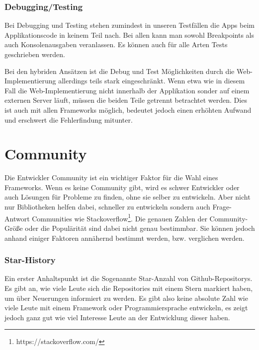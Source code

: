 \subsubsection{Debugging/Testing}
Bei Debugging und Testing stehen zumindest in unseren Testfällen die Apps beim Applikationscode in keinem Teil nach. Bei allen kann man sowohl Breakpoints als auch Konsolenausgaben veranlassen. Es können auch für alle Arten Tests geschrieben werden.

Bei den hybriden Ansätzen ist die Debug und Test Möglichkeiten  durch die Web-Implementierung allerdings teils stark eingeschränkt. Wenn etwa wie in diesem Fall die Web-Implementierung nicht innerhalb der Applikation sonder auf einem externen Server läuft, müssen die beiden Teile getrennt betrachtet werden. Dies ist auch mit allen Frameworks möglich, bedeutet jedoch einen erhöhten Aufwand und erschwert die Fehlerfindung mitunter.

\section{Community}
Die Entwickler Community ist ein wichtiger Faktor für die Wahl eines Frameworks. Wenn es keine Community gibt, wird es schwer Entwickler oder auch Lösungen für Probleme zu finden, ohne sie selber zu entwickeln. Aber nicht nur Bibliotheken helfen dabei, schneller zu entwickeln sondern auch Frage-Antwort Communities wie Stackoverflow\footnote{https://stackoverflow.com/}.  Die genauen Zahlen der Community-Größe oder die Populärität sind dabei nicht genau bestimmbar. Sie können jedoch anhand einiger Faktoren annähernd bestimmt werden, bzw. verglichen werden.

\subsubsection{Star-History}

Ein erster Anhaltspunkt ist die Sogenannte Star-Anzahl von Github-Repositorys. Es gibt an, wie viele Leute sich die Repositories mit einem Stern markiert haben, um über Neuerungen informiert zu werden. Es gibt also keine absolute Zahl wie viele Leute mit einem Framework oder Programmiersprache entwickeln, es zeigt jedoch ganz gut wie viel Interesse Leute an der Entwicklung dieser haben.

